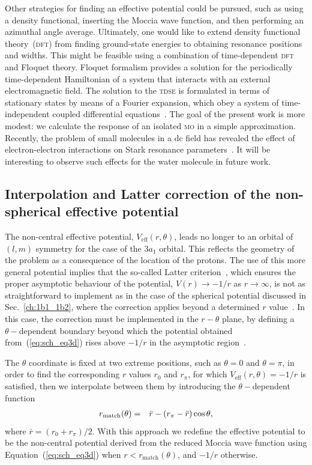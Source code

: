 Other strategies for finding an effective potential could be pursued,
such as using a density functional, inserting the Moccia wave
function, and then performing an azimuthal angle average. Ultimately,
one would like to extend density functional theory~(\textsc{dft}) from
finding ground-state energies to obtaining resonance positions and
widths. This might be feasible using a combination of time-dependent
\textsc{dft} and Floquet theory. Floquet formalism provides a solution
for the periodically time-dependent Hamiltonian of a system that
interacts with an external electromagnetic field. The solution to the
\textsc{tdse} is formulated in terms of stationary states by means of
a Fourier expansion, which obey a system of time-independent coupled
differential
equations~\cite{Joachain_mpi_tunneling,Tsog_H2mol_ac_2013}. The goal
of the present work is more modest: we calculate the response of an
isolated \textsc{mo} in a simple approximation. Recently, the
problem of small molecules in a dc field has revealed the effect of
electron-electron interactions on Stark resonance
parameters~\cite{ScrinziJPhysB_ECS}. It will be interesting to observe
such effects for the water molecule in future work.


\subsection{Interpolation and Latter correction of the
  non-spherical effective potential}
\label{ch:3a1_Latter}

The non-central effective potential, $V_{\mathrm{eff}}(r,\theta)$,
leads no longer to an orbital of $(l,m)$ symmetry for the case of the
$3a_{1}$ orbital. This reflects the geometry of the problem as a
consequence of the location of the protons. The use of this more
general potential implies that the so-called Latter
criterion~\cite{LatterCor_1955}, which ensures the proper asymptotic
behaviour of the potential, $V(r)\to -1/r$ as $r\to\infty$, is not as
straightforward to implement as in the case of the spherical potential
discussed in Sec.~\ref{ch:1b1_1b2}, where the correction applies
beyond a determined $r$ value~\cite{sarias_2016}. In this case, the
correction must be implemented in the $r-\theta$ plane, by defining a
$\theta-$dependent boundary beyond which the potential obtained
from~(\ref{eq:sch_eq3d}) rises above $-1/r$ in the asymptotic
region~\cite{sarias_2017}.

The $\theta$ coordinate is fixed at two extreme positions, such as
$\theta = 0$ and $\theta = \pi$, in order to find the corresponding
$r$ values $r_{0}$ and $r_{\pi}$, for which
$V_{\mathrm{eff}}(r,\theta) = -1/r$ is satisfied, then we interpolate
between them by introducing the $\theta-$dependent function
%
\begin{eqnarray}
r_{\rm{match}}(\theta) & = & \bar{r} - (r_{\pi} - \bar{r}) \cos\theta,
\label{eq:rMatch}
\end{eqnarray}
%
where $\bar{r} = (r_{0} + r_{\pi})/2$. With this approach we redefine
the effective potential to be the non-central potential derived from
the reduced Moccia wave function using Equation~(\ref{eq:sch_eq3d})
when $r < r_{\mathrm{match}}(\theta)$, and $-1/r$ otherwise.

